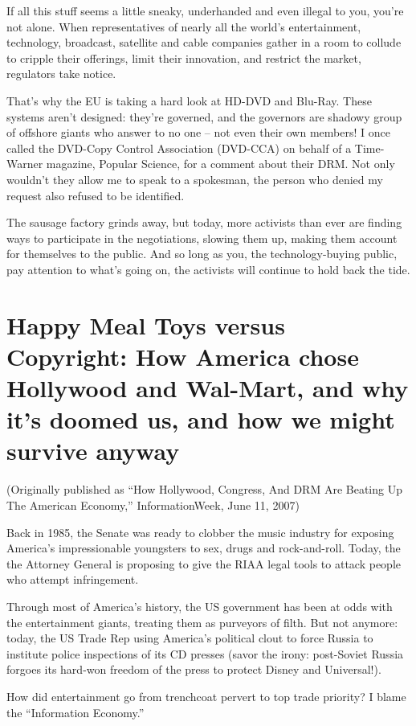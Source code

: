 If all this stuff seems a little sneaky, underhanded and even
illegal to you, you're not alone. When representatives of nearly
all the world's entertainment, technology, broadcast, satellite and
cable companies gather in a room to collude to cripple their
offerings, limit their innovation, and restrict the market,
regulators take notice.

That's why the EU is taking a hard look at HD-DVD and Blu-Ray.
These systems aren't designed: they're governed, and the governors
are shadowy group of offshore giants who answer to no one -- not
even their own members! I once called the DVD-Copy Control
Association (DVD-CCA) on behalf of a Time-Warner magazine, Popular
Science, for a comment about their DRM. Not only wouldn't they
allow me to speak to a spokesman, the person who denied my request
also refused to be identified.

The sausage factory grinds away, but today, more activists than
ever are finding ways to participate in the negotiations, slowing
them up, making them account for themselves to the public. And so
long as you, the technology-buying public, pay attention to what's
going on, the activists will continue to hold back the tide.

\section{Happy Meal Toys versus Copyright: How America chose Hollywood and Wal-Mart, and why it's doomed us, and how we might survive anyway}

(Originally published as ``How Hollywood, Congress, And DRM Are
Beating Up The American Economy,'' InformationWeek, June 11, 2007)

Back in 1985, the Senate was ready to clobber the music industry
for exposing America's impressionable youngsters to sex, drugs and
rock-and-roll. Today, the the Attorney General is proposing to give
the RIAA legal tools to attack people who attempt infringement.

Through most of America's history, the US government has been at
odds with the entertainment giants, treating them as purveyors of
filth. But not anymore: today, the US Trade Rep using America's
political clout to force Russia to institute police inspections of
its CD presses (savor the irony: post-Soviet Russia forgoes its
hard-won freedom of the press to protect Disney and Universal!).

How did entertainment go from trenchcoat pervert to top trade
priority? I blame the ``Information Economy.''

